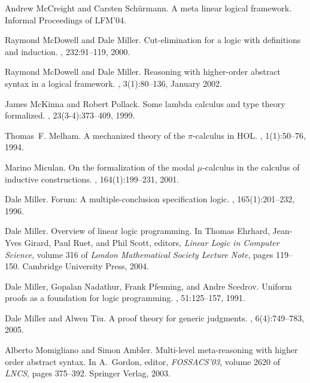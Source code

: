 \documentclass[final]{svjour3}
\begin{document}
\begin{thebibliography}{100}
Andrew McCreight and Carsten Sch{\"u}rmann.
\newblock A meta linear logical framework.
\newblock Informal Proceedings of LFM'04.

Raymond McDowell and Dale Miller.
\newblock Cut-elimination for a logic with definitions and induction.
, 232:91--119, 2000.

Raymond McDowell and Dale Miller.
\newblock Reasoning with higher-order abstract syntax in a logical framework.
, 3(1):80--136, January
  2002.

James McKinna and Robert Pollack.
\newblock Some lambda calculus and type theory formalized.
, 23(3-4):373--409, 1999.

Thomas~F. Melham.
\newblock A mechanized theory of the $\pi$-calculus in {HOL}.
, 1(1):50--76, 1994.

Marino Miculan.
\newblock On the formalization of the modal $\mu$-calculus in the calculus of
  inductive constructions.
, 164(1):199--231, 2001.

Dale Miller.
\newblock Forum: {A} multiple-conclusion specification logic.
, 165(1):201--232, 1996.

Dale Miller.
\newblock Overview of linear logic programming.
\newblock In Thomas Ehrhard, Jean-Yves Girard, Paul Ruet, and Phil Scott,
  editors, {\em Linear Logic in Computer Science}, volume 316 of {\em London
  Mathematical Society Lecture Note}, pages 119--150. Cambridge University
  Press, 2004.

Dale Miller, Gopalan Nadathur, Frank Pfenning, and Andre Scedrov.
\newblock Uniform proofs as a foundation for logic programming.
, 51:125--157, 1991.

Dale Miller and Alwen Tiu.
\newblock A proof theory for generic judgments.
, 6(4):749--783, 2005.

Alberto Momigliano and Simon Ambler.
\newblock Multi-level meta-reasoning with higher order abstract syntax.
\newblock In A.~Gordon, editor, {\em FOSSACS'03}, volume 2620 of {\em LNCS},
  pages 375--392. Springer Verlag, 2003.


\end{thebibliography}
\end{document}
